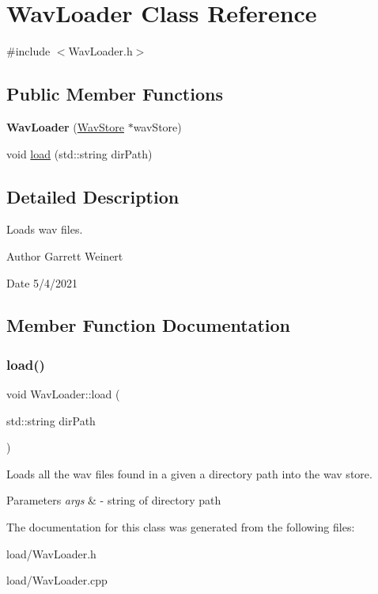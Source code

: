 \hypertarget{classWavLoader}{}\section{Wav\+Loader Class Reference}
\label{classWavLoader}


{\ttfamily \#include $<$Wav\+Loader.\+h$>$}

\subsection*{Public Member Functions}
\begin{DoxyCompactItemize}
\item 
\mbox{\label{classWavLoader_ad47462419d7decab21c102a90a922a32}} 
{\bfseries Wav\+Loader} (\hyperlink{classWavStore}{Wav\+Store} $\ast$wav\+Store)
\item 
void \hyperlink{classWavLoader_a87fabe5a077f8ddb25a10f9e2f731f46}{load} (std\+::string dir\+Path)
\end{DoxyCompactItemize}


\subsection{Detailed Description}
Loads wav files. \begin{DoxyAuthor}{Author}
Garrett Weinert 
\end{DoxyAuthor}
\begin{DoxyDate}{Date}
5/4/2021 
\end{DoxyDate}


\subsection{Member Function Documentation}
\mbox{\label{classWavLoader_a87fabe5a077f8ddb25a10f9e2f731f46}} 
\subsubsection{\texorpdfstring{load()}{load()}}
{\footnotesize\ttfamily void Wav\+Loader\+::load (\begin{DoxyParamCaption}\item[{std\+::string}]{dir\+Path }\end{DoxyParamCaption})}

Loads all the wav files found in a given a directory path into the wav store. 
\begin{DoxyParams}{Parameters}
{\em args} & -\/ string of directory path \\
\hline
\end{DoxyParams}


The documentation for this class was generated from the following files\+:\begin{DoxyCompactItemize}
\item 
load/Wav\+Loader.\+h\item 
load/Wav\+Loader.\+cpp\end{DoxyCompactItemize}
